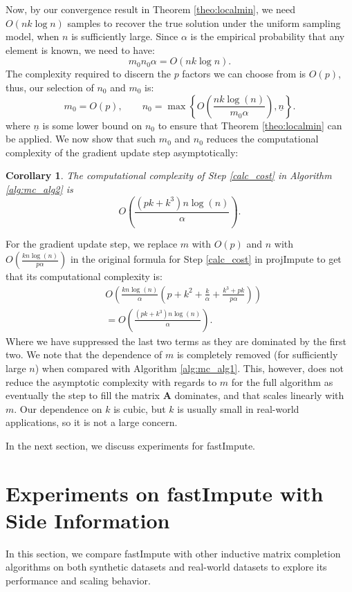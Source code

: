 \documentclass[twoside,11pt]{article}
\newtheorem{cor}{Corollary}
\begin{document}
Now, by our convergence result in Theorem \ref{theo:localmin}, we need $O(n k \log n)$ samples to recover the true solution under the uniform sampling model, when $n$ is sufficiently large. Since $\alpha$ is the empirical probability that any element is known, we need to have:
\[m_0n_0\alpha = O(n k \log n).\]
The complexity required to discern the $p$ factors we can choose from is $O(p)$, thus, our selection of $n_0$ and $m_0$ is:
$$m_0=O(p) , \qquad n_0=\max\left\{O\left(\frac{nk\log (n)}{m_0\alpha}\right),\underline{n}\right\}.$$
where $\underline{n}$ is some lower bound on $n_0$ to ensure that Theorem \ref{theo:localmin} can be applied. We now show that such $m_0$ and $n_0$ reduces the computational complexity of the gradient update step asymptotically:
\begin{cor}
\label{cor:fastimputecomp}
The computational complexity of Step \ref{calc_cost} in Algorithm \ref{alg:mc_alg2} is $$O\left(\frac{(pk+k^3)n\log (n)}{\alpha}\right).$$
\end{cor}
\proof
For the gradient update step, we replace $m$ with $O(p)$ and $n$ with $O\left(\frac{kn\log (n)}{p\alpha}\right)$ in the original formula for Step \ref{calc_cost} in projImpute to get that its computational complexity is:
\begin{align*}
    &O\left(\frac{kn\log (n)}{\alpha}\left(p+k^2+\frac{k}{\alpha}+\frac{k^3+pk}{p\alpha}\right)\right)
    \\&=O\left(\frac{(pk+k^3)n\log (n)}{\alpha}\right).
\end{align*}
Where we have suppressed the last two terms as they are dominated by the first two.
\endproof
We note that the dependence of $m$ is completely removed (for sufficiently large $n$) when compared with Algorithm \ref{alg:mc_alg1}. This, however, does not reduce the asymptotic complexity with regards to $m$ for the full algorithm as eventually the step to fill the matrix $\bm{A}$ dominates, and that scales linearly with $m$. Our dependence on $k$ is cubic, but $k$ is usually small in real-world applications, so it is not a large concern. 

In the next section, we discuss experiments   for fastImpute.
\section{Experiments on fastImpute with Side Information}
\label{sec:mc_computeside}
In this section, we  compare fastImpute with other inductive matrix completion algorithms on both synthetic datasets and real-world datasets to explore its performance and scaling behavior.
\end{document}
